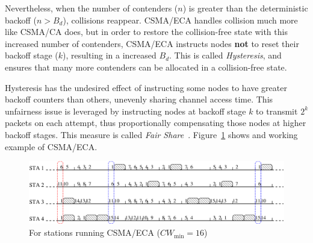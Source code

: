Nevertheless, when the number of contenders ($n$) is greater than the deterministic backoff ($n>B_{d}$), collisions reappear. CSMA/ECA handles collision much more like CSMA/CA does, but in order to restore the collision-free state with this increased number of contenders, CSMA/ECA instructs nodes {\bfseries not} to reset their backoff stage ($k$), resulting in a increased $B_{d}$. This is called \emph{Hysteresis}, and ensures that many more contenders can be allocated in a collision-free state.

Hysteresis has the undesired effect of instructing some nodes to have greater backoff counters than others, unevenly sharing channel access time. This unfairness issue is leveraged by instructing nodes at backoff stage $k$ to transmit $2^{k}$ packets on each attempt, thus proportionally compensating those nodes at higher backoff stages. This measure is called \emph{Fair Share}~\cite{research2standards}. Figure~\ref{fig:csmaECA} shows and working example of CSMA/ECA.

\begin{figure}[htbp]
  \centering
  \includegraphics[width=\linewidth]{csma_eca_different_backoff_short.eps}
  \caption{For stations running CSMA/ECA ($CW_{\min}=16$)
  \label{fig:csmaECA}}
\end{figure}
